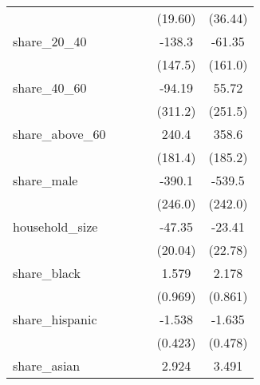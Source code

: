 {\begin{tabular}{l*{5}{c}}
            &                     &                     &                     &     (19.60)         &     (36.44)         \\
[1em]
share\_20\_40 &                     &                     &                     &      -138.3         &      -61.35         \\
            &                     &                     &                     &     (147.5)         &     (161.0)         \\
[1em]
share\_40\_60 &                     &                     &                     &      -94.19         &       55.72         \\
            &                     &                     &                     &     (311.2)         &     (251.5)         \\
[1em]
share\_above\_60&                     &                     &                     &       240.4         &       358.6         \\
            &                     &                     &                     &     (181.4)         &     (185.2)         \\
[1em]
share\_male  &                     &                     &                     &      -390.1         &      -539.5\sym{*}  \\
            &                     &                     &                     &     (246.0)         &     (242.0)         \\
[1em]
household\_size&                     &                     &                     &      -47.35\sym{*}  &      -23.41         \\
            &                     &                     &                     &     (20.04)         &     (22.78)         \\
[1em]
share\_black &                     &                     &                     &       1.579         &       2.178\sym{*}  \\
            &                     &                     &                     &     (0.969)         &     (0.861)         \\
[1em]
share\_hispanic&                     &                     &                     &      -1.538\sym{***}&      -1.635\sym{***}\\
            &                     &                     &                     &     (0.423)         &     (0.478)         \\
[1em]
share\_asian &                     &                     &                     &       2.924\sym{*}  &       3.491\sym{***}\\

\end{tabular}}
